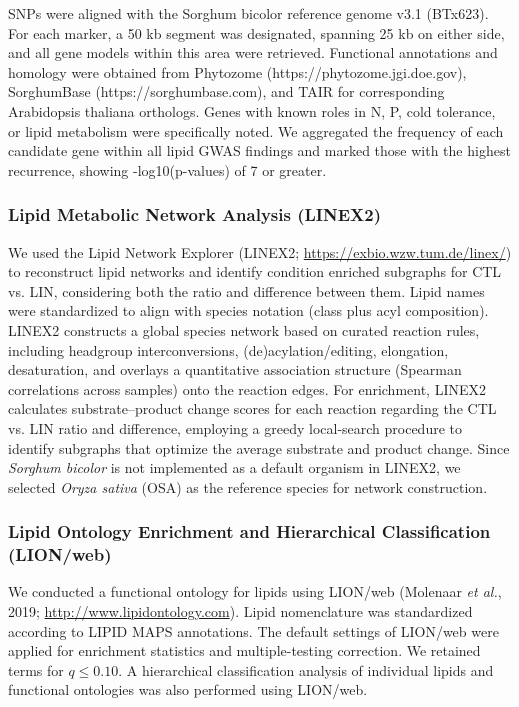\documentclass[9pt,twocolumn,twoside]{rilabRxiv}
\begin{document}
SNPs were aligned with the Sorghum bicolor reference genome v3.1 (BTx623). For each marker, a 50 kb segment was designated, spanning 25 kb on either side, and all gene models within this area were retrieved. Functional annotations and homology were obtained from Phytozome (https://phytozome.jgi.doe.gov), SorghumBase (https://sorghumbase.com), and TAIR for corresponding Arabidopsis thaliana orthologs. Genes with known roles in N, P, cold tolerance, or lipid metabolism were specifically noted. We aggregated the frequency of each candidate gene within all lipid GWAS findings and marked those with the highest recurrence, showing -log10(p-values) of 7 or greater.

\subsubsection*{Lipid Metabolic Network Analysis (LINEX2)}

We used the Lipid Network Explorer (LINEX2; \url{https://exbio.wzw.tum.de/linex/}) to reconstruct lipid networks and identify condition enriched subgraphs for CTL vs. LIN, considering both the ratio and difference between them. Lipid names were standardized to align with species notation (class plus acyl composition). LINEX2 constructs a global species network based on curated reaction rules, including headgroup interconversions, (de)acylation/editing, elongation, desaturation, and overlays a quantitative association structure (Spearman correlations across samples) onto the reaction edges. For enrichment, LINEX2 calculates substrate–product change scores for each reaction regarding the CTL vs. LIN ratio and difference, employing a greedy local-search procedure to identify subgraphs that optimize the average substrate and product change. Since \textit{Sorghum bicolor} is not implemented as a default organism in LINEX2, we selected \textit{Oryza sativa} (OSA) as the reference species for network construction.


\subsubsection*{Lipid Ontology Enrichment and Hierarchical Classification (LION/web)}

We conducted a functional ontology for lipids using LION/web (Molenaar \emph{et al.}, 2019; \url{http://www.lipidontology.com}). Lipid nomenclature was standardized according to LIPID MAPS annotations. The default settings of LION/web were applied for enrichment statistics and multiple-testing correction. We retained terms for $q \leq 0.10$. A hierarchical classification analysis of individual lipids and functional ontologies was also performed using LION/web.
\end{document}
